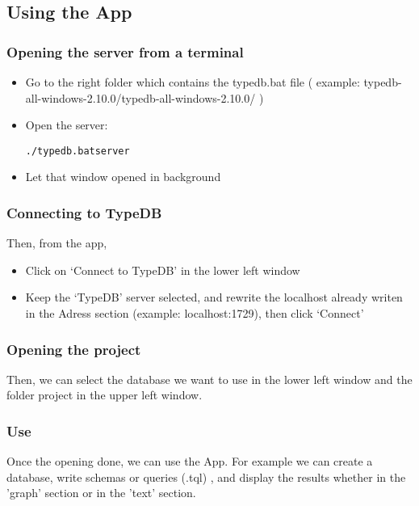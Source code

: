\documentclass{article}
\begin{document}
\subsection{Using the App}

\subsubsection{Opening the server from a terminal}
\begin{itemize}
\item Go to the right folder which contains the typedb.bat file ( example: typedb-all-windows-2.10.0/typedb-all-windows-2.10.0/ )
\item Open the server: \begin{alltt}./typedb.bat server \end{alltt}
\item Let that window opened in background
\end{itemize}

\subsubsection{Connecting to TypeDB}
Then, from the app,
\begin{itemize}
\item Click on ‘Connect to TypeDB’ in the lower left window
\item Keep the ‘TypeDB’ server selected, and rewrite the localhost already writen in the Adress section (example: localhost:1729), then click ‘Connect’
\end{itemize}

\subsubsection{Opening the project}
Then, we can select the database we want to use in the lower left window and the folder project in the upper left window.

\subsubsection{Use}
    Once the opening done, we can use the App. For example we can create a database, write schemas or queries (.tql) , and display the results whether in the 'graph' section or in the 'text' section.
    
\end{document}
